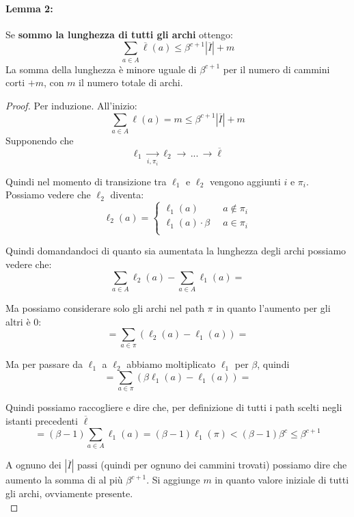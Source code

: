 \newpage

\paragraph{Lemma 2:} Se \textbf{sommo la lunghezza di tutti gli archi} ottengo:
$$ \sum_{a \in A} \overline{\ell}(a) \leq \beta^{c+1} |\overline{I}| + m $$
La somma della lunghezza è minore uguale di $\beta^{c+1}$ per il numero di cammini corti $+ m$, con $m$ il numero totale di archi.\\

\begin{proof}
	Per induzione. All'inizio: 
	$$ \sum_{a \in A} \ell (a) = m  \leq \beta^{c+1} |\overline{I}| + m$$
	Supponendo che 
	$$ \ell_1 \xrightarrow[i, \pi_i]{} \ell_2 \rightarrow \, ... \, \rightarrow \overline{\ell}$$
	
	Quindi nel momento di transizione tra $\ell_1$ e $\ell_2$ vengono aggiunti $i$ e $\pi_i$. \\
	Possiamo vedere che $\ell_2$ diventa:
	$$
	\ell_2 (a) = \begin{cases}
		\ell_1 (a) & a \notin \pi_i \\
		\ell_1 (a) \cdot \beta \;\; & a \in \pi_i \\
	\end{cases}
	$$
	
	Quindi domandandoci di quanto sia aumentata la lunghezza degli archi possiamo vedere che:
	$$ \sum_{a \in A} \ell_2 (a) - \sum_{a \in A} \ell_1 (a) = $$
	
	Ma possiamo considerare solo gli archi nel path $\pi$ in quanto l'aumento per gli altri è 0: 
	$$ = \sum_{a \in \pi} \left(\ell_2 (a) - \ell_1 (a)\right) =$$
	
	Ma per passare da $\ell_1$ a $\ell_2$ abbiamo moltiplicato $\ell_1$ per $\beta$, quindi
	$$ = \sum_{a \in \pi} \left( \beta \ell_1 (a) - \ell_1 (a) \right) = $$
	
	Quindi possiamo raccogliere e dire che, per definizione di tutti i path scelti negli istanti precedenti $\overline{\ell}$
	$$ = (\beta -1) \sum_{a \in A} \ell_1 (a) = (\beta -1) \ell_1 (\pi) < (\beta -1) \beta^c \leq \beta^{c+1} $$
	
	A ognuno dei $|\overline{I}|$ passi (quindi per ognuno dei cammini trovati) possiamo dire che aumento la somma di al più $\beta^{c+1}$. Si aggiunge $m$ in quanto valore iniziale di tutti gli archi, ovviamente presente.\\
\end{proof}


